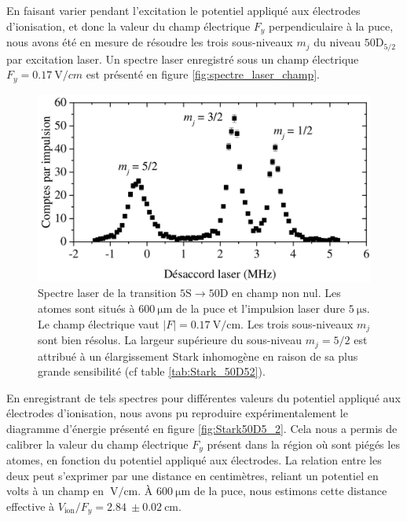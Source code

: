En faisant varier pendant l'excitation le potentiel appliqué aux électrodes d'ionisation, et donc la valeur du champ électrique $F_y$ perpendiculaire à la puce, nous avons été en mesure de résoudre les trois sous-niveaux $m_j$ du niveau $\mathrm{50D}_{5/2}$ par excitation laser.
Un spectre laser enregistré sous un champ électrique $F_y = \SI{0.17}{\V/cm}$ est présenté en figure \eqref{fig:spectre_laser_champ}.

\begin{figure}[h]
\centering
\includegraphics[width=0.85\linewidth]{figures/circulars/spectre_laser_champ}
\caption[Spectre laser de la transition $\mathrm{5S\rightarrow 50D}$ en champ non nul]{
Spectre laser de la transition $\mathrm{5S\rightarrow 50D}$ en champ non nul.
Les atomes sont situés à $\SI{600}{\um}$ de la puce et l'impulsion laser dure $\SI{5}{\us}$.
Le champ électrique vaut $|F| = \SI{0.17}{\V/\cm}$.
Les trois sous-niveaux $m_j$ sont bien résolus.
La largeur supérieure du sous-niveau $m_j=5/2$ est attribué à un élargissement Stark inhomogène en raison de sa plus grande sensibilité (cf table \eqref{tab:Stark_50D52}).
}
\label{fig:spectre_laser_champ}
\end{figure}

En enregistrant de tels spectres pour différentes valeurs du potentiel appliqué aux électrodes d'ionisation, nous avons pu reproduire expérimentalement le diagramme d'énergie présenté en figure \eqref{fig:Stark50D5_2}.
Cela nous a permis de calibrer la valeur du champ électrique $F_y$ présent dans la région où sont piégés les atomes, en fonction du potentiel appliqué aux électrodes.
La relation entre les deux peut s'exprimer par une distance en centimètres, reliant un potentiel en volts à un champ en $\SI{}{\V/\cm}$.
\`A $\SI{600}{\um}$ de la puce, nous estimons cette distance effective à $V_{\mathrm{ion}}/F_y = \SI{2.84}{} \pm \SI{0.02}{\cm}$.%


